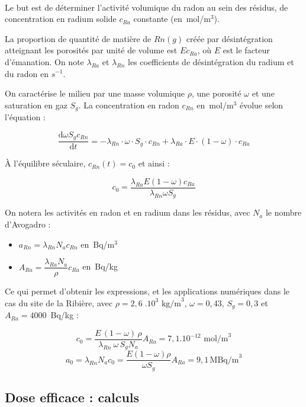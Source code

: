 \documentclass{article}
\begin{document}
\paragraph{} Le but est de déterminer l'activité volumique du radon au sein des résidus, de concentration en radium solide $c_{Ra}$ constante (en~mol/m$^3$).

La proportion de quantité de matière de $Rn(g)$ créée par désintégration atteignant les porosités par unité de volume est $E c_{Ra}$, où $E$ est le facteur d’émanation. On note $\lambda_{Ra}$ et $\lambda_{Rn}$ les coefficients de désintégration du radium et du radon en $s^{-1}$. 

On caractérise le milieu par une masse volumique $\rho$, une porosité $\omega$ et une saturation en gaz $S_g$. La concentration en radon $c_{Rn}$ en~mol/m$^3$ évolue selon l'équation :

$$
\frac{\text{d} \omega S_g c_{Rn}}{\text{d}t} = - \lambda_{Rn}\cdot \omega\cdot S_g \cdot c_{Rn} + \lambda_{Ra} \cdot E \cdot(1-\omega)\cdot c_{Ra}
$$

À l'équilibre séculaire, $c_{Rn}(t)=c_0$ et ainsi :

$$
c_0 = \frac{ \lambda_{Ra} E (1-\omega) c_{Ra} }{\lambda_{Rn} \omega S_g}
$$

On notera les activités en radon et en radium dans les résidus, avec $N_a$ le nombre d'Avogadro :
\begin{itemize}
  \item $a_{Rn}= \lambda_{Rn} N_a c_{Rn}$ en~Bq/m$^3$
  \item $A_{Ra}= \dfrac{\lambda_{Ra} N_a }{\rho} c_{Ra}$ en~Bq/kg
\end{itemize}

Ce qui permet d'obtenir les expressions, et les applications numériques dans le cas du site de la Ribière, avec $\rho = 2,6 \;.10^3 \text{ kg/m}^3$, $\omega= 0,43$, $S_g=0,3$ et $A_{Ra}=4 000$~Bq/kg :

$$
c_0 = \dfrac{ E \,(1-\omega)\, \rho }{\lambda_{Rn}\: \omega \,S_g N_a} A_{Ra} = 7,1.10^{-12} \text{ mol/m}^3
$$
$$
a_0=\lambda_{Rn} N_a c_0 =\frac{E(1-\omega)\rho}{\omega S_g} A_{Ra} =9,1 \, \text{MBq/m}^3
$$

\subsection{Dose efficace : calculs}
\label{annexe:dose_efficace}
\end{document}
